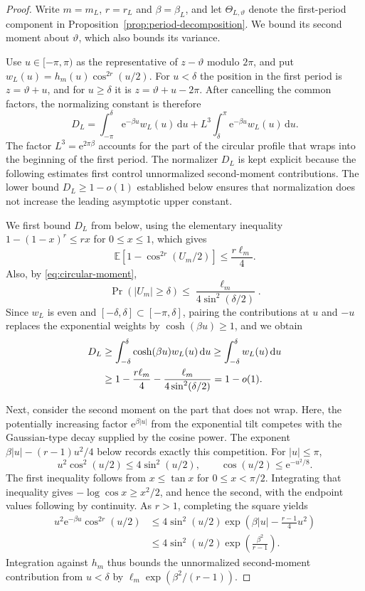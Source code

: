 \documentclass[11pt]{article}
\numberwithin{equation}{section}
\theoremstyle{remark}
\newcommand{\E}{\mathbb E}
\newcommand{\e}{\mathrm e}
\newcommand{\dd}{\,\mathrm d}
\begin{document}
\begin{proof}
Write $m=m_L$, $r=r_L$ and $\beta=\beta_L$, and let $\Theta_{L,\vartheta}$ denote the first-period component in Proposition~\ref{prop:period-decomposition}. We bound its second moment about $\vartheta$, which also bounds its variance.

Use $u\in[-\pi,\pi)$ as the representative of $z-\vartheta$ modulo $2\pi$, and put $w_L(u)=h_m(u)\cos^{2r}(u/2)$. For $u<\delta$ the position in the first period is $z=\vartheta+u$, and for $u\geq\delta$ it is $z=\vartheta+u-2\pi$. After cancelling the common factors, the normalizing constant is therefore
\[
  D_L=\int_{-\pi}^{\delta}\e^{-\beta u}w_L(u)\dd u
        +L^3\int_{\delta}^{\pi}\e^{-\beta u}w_L(u)\dd u.
\]
The factor $L^3=\e^{2\pi\beta}$ accounts for the part of the circular profile that wraps into the beginning of the first period. The normalizer $D_L$ is kept explicit because the following estimates first control unnormalized second-moment contributions. The lower bound $D_L\geq1-o(1)$ established below ensures that normalization does not increase the leading asymptotic upper constant.

We first bound $D_L$ from below, using the elementary inequality $1-(1-x)^r\leq rx$ for $0\leq x\leq1$, which gives
\[
  \E\!\left[1-\cos^{2r}(U_m/2)\right]\leq\frac{r\ell_m}{4}.
\]
Also, by \eqref{eq:circular-moment},
\[
  \Pr(|U_m|\geq\delta)
  \leq\frac{\ell_m}{4\sin^2(\delta/2)}.
\]
Since $w_L$ is even and $[-\delta,\delta]\subset[-\pi,\delta]$, pairing the contributions at $u$ and $-u$ replaces the exponential weights by $\cosh(\beta u)\geq1$, and we obtain
\begin{align}
  D_L
  &\geq\int_{-\delta}^{\delta}\cosh(\beta u)w_L(u)\dd u
   \geq\int_{-\delta}^{\delta}w_L(u)\dd u \notag\\
  &\geq1-\frac{r\ell_m}{4}
          -\frac{\ell_m}{4\sin^2(\delta/2)}
   =1-o(1).
  \label{eq:normalizer-bound}
\end{align}

Next, consider the second moment on the part that does not wrap. Here, the potentially increasing factor $\e^{\beta|u|}$ from the exponential tilt competes with the Gaussian-type decay supplied by the cosine power. The exponent $\beta|u|-(r-1)u^2/4$ below records exactly this competition. For $|u|\leq\pi$,
\begin{equation}\label{eq:elementary-cosine-bounds}
  u^2\cos^2(u/2)\leq4\sin^2(u/2),
  \qquad
  \cos(u/2)\leq\e^{-u^2/8}.
\end{equation}
The first inequality follows from $x\leq\tan x$ for $0\leq x<\pi/2$. Integrating that inequality gives $-\log\cos x\geq x^2/2$, and hence the second, with the endpoint values following by continuity. As $r>1$, completing the square yields
\begin{align*}
  u^2\e^{-\beta u}\cos^{2r}(u/2)
  &\leq4\sin^2(u/2)
      \exp\!\left(\beta|u|-\frac{r-1}{4}u^2\right)\\
  &\leq4\sin^2(u/2)\exp\!\left(\frac{\beta^2}{r-1}\right).
\end{align*}
Integration against $h_m$ thus bounds the unnormalized second-moment contribution from $u<\delta$ by $\ell_m\exp(\beta^2/(r-1))$.


\end{proof}
\end{document}
